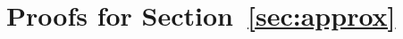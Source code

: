 \documentclass{article}
\theoremstyle{plain}
\theoremstyle{definition}
\theoremstyle{remark}
\begin{document}





\newpage
\appendix
\onecolumn
\section{Proofs for Section~\ref{sec:approx}}\label{app:proofs}
\end{document}
